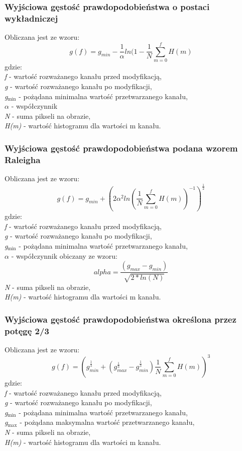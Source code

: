 \documentclass{classrep}
\begin{document}
\subsubsection{Wyjściowa gęstość prawdopodobieństwa o postaci wykładniczej}
Obliczana jest ze wzoru:
\[ g(f) = g_{min} - \frac{1}{\alpha} ln (1 - \frac{1}{N} \displaystyle\sum_{m=0}^{f} H(m) \]
gdzie:\\
\textit{f} - wartość rozważanego kanału przed modyfikacją,\\
\textit{g} - wartość rozważanego kanału po modyfikacji,\\
\textit{g$_{\text{min}}$} - pożądana minimalna wartość przetwarzanego kanału,\\
\textit{$\alpha$} - współczynnik\\
\textit{N} - suma pikseli na obrazie,\\
\textit{H(m)} - wartość histogramu dla wartości m kanału.\\

\subsubsection{Wyjściowa gęstość prawdopodobieństwa podana wzorem Raleigha}
Obliczana jest ze wzoru:
\[ g(f) = g_{min} + (2 \alpha^2 ln (\frac{1}{N} \displaystyle\sum_{m=0}^{f} H(m))^{-1})^\frac{1}{2} \]
gdzie:\\
\textit{f} - wartość rozważanego kanału przed modyfikacją,\\
\textit{g} - wartość rozważanego kanału po modyfikacji,\\
\textit{g$_{\text{min}}$} - pożądana minimalna wartość przetwarzanego kanału,\\
\textit{$\alpha$} - współczynnik obiczany ze wzoru:
\[ alpha = \frac{(g_{max} - g_{min})}{\sqrt{2 \ast ln(N)}} \]
\textit{N} - suma pikseli na obrazie,\\
\textit{H(m)} - wartość histogramu dla wartości m kanału.\\

\subsubsection{Wyjściowa gęstość prawdopodobieństwa określona przez potęgę 2/3}
Obliczana jest ze wzoru:
\[ g(f) = (g_{min}^\frac{1}{3} + (g_{max}^\frac{1}{3} - g_{min}^\frac{1}{3}) \frac{1}{N} \displaystyle\sum_{m=0}^{f} H(m))^3 \]
gdzie:\\
\textit{f} - wartość rozważanego kanału przed modyfikacją,\\
\textit{g} - wartość rozważanego kanału po modyfikacji,\\
\textit{g$_{\text{min}}$} - pożądana minimalna wartość przetwarzanego kanału,\\
\textit{g$_{\text{max}}$} - pożądana maksymalna wartość przetwarzanego kanału,\\
\textit{N} - suma pikseli na obrazie,\\
\textit{H(m)} - wartość histogramu dla wartości m kanału.\\
\end{document}
